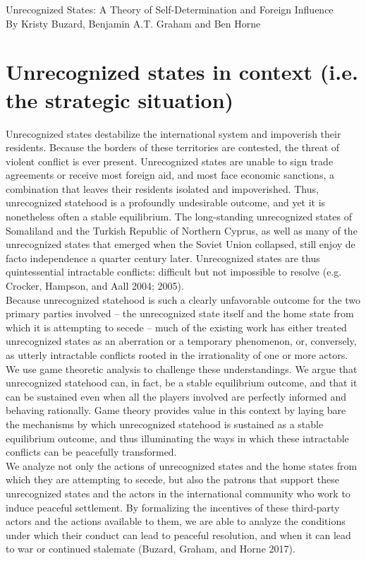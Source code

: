 \documentclass[12pt]{article}
\begin{document}
\begin{center}
  Unrecognized States: A Theory of Self-Determination and Foreign Influence \\
	By Kristy Buzard, Benjamin A.T. Graham and Ben Horne
\end{center}

\section{Unrecognized states in context (i.e. the strategic situation)}
Unrecognized states destabilize the international system and impoverish their residents. Because the borders of these territories are contested, the threat of violent conflict is ever present. Unrecognized states are unable to sign trade agreements or receive most foreign aid, and most face economic sanctions, a combination that leaves their residents isolated and impoverished. Thus, unrecognized statehood is a profoundly undesirable outcome, and yet it is nonetheless often a stable equilibrium. The long-standing unrecognized states of Somaliland and the Turkish Republic of Northern Cyprus, as well as many of the unrecognized states that emerged when the Soviet Union collapsed, still enjoy de facto independence a quarter century later. Unrecognized states are thus quintessential intractable conflicts: difficult but not impossible to resolve (e.g. Crocker, Hampson, and Aall 2004; 2005).\\

Because unrecognized statehood is such a clearly unfavorable outcome for the two primary parties involved – the unrecognized state itself and the home state from which it is attempting to secede – much of the existing work has either treated unrecognized states as an aberration or a temporary phenomenon, or, conversely, as utterly intractable conflicts rooted in the irrationality of one or more actors. We use game theoretic analysis to challenge these understandings. We argue that unrecognized statehood can, in fact, be a stable equilibrium outcome, and that it can be sustained even when all the players involved are perfectly informed and behaving rationally. Game theory provides value in this context by laying bare the mechanisms by which unrecognized statehood is sustained as a stable equilibrium outcome, and thus illuminating the ways in which these intractable conflicts can be peacefully transformed. \\

We analyze not only the actions of unrecognized states and the home states from which they are attempting to secede, but also the patrons that support these unrecognized states and the actors in the international community who work to induce peaceful settlement. By formalizing the incentives of these third-party actors and the actions available to them, we are able to analyze the conditions under which their conduct can lead to peaceful resolution, and when it can lead to war or continued stalemate (Buzard, Graham, and Horne 2017). \\
\end{document}
